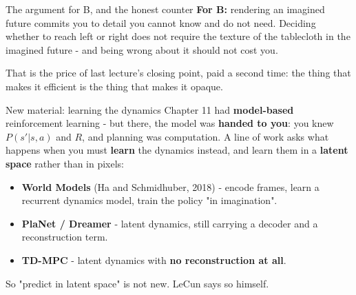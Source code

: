 \documentclass[aspectratio=169]{beamer}
\begin{document}
\begin{frame}{The argument for B, and the honest counter}
  \small
  \textbf{For B:} rendering an imagined future commits you to detail you cannot know and
  do not need. Deciding whether to reach left or right does not require the texture of the
  tablecloth in the imagined future - and being wrong about it should not cost you.
  \vskip 10pt
  \begin{center}
  \end{center}
  \vskip 8pt
  \footnotesize
  That is the price of last lecture's closing point, paid a second time: the thing that
  makes it efficient is the thing that makes it opaque.
\end{frame}

\begin{frame}{New material: learning the dynamics}
  \small
  Chapter 11 had \textbf{model-based} reinforcement learning - but there, the model was
  \textbf{handed to you}: you knew $P(s'|s,a)$ and $R$, and planning was computation.
  \vskip 8pt
  A line of work asks what happens when you must \textbf{learn} the dynamics instead, and
  learn them in a \textbf{latent space} rather than in pixels:
  \vskip 6pt
  \begin{itemize}\small
    \item \textbf{World Models} (Ha and Schmidhuber, 2018) - encode frames, learn a
      recurrent dynamics model, train the policy "in imagination".
    \item \textbf{PlaNet / Dreamer} - latent dynamics, still carrying a decoder and a
      reconstruction term.
    \item \textbf{TD-MPC} - latent dynamics with \textbf{no reconstruction at all}.
  \end{itemize}
  \vskip 8pt
  \begin{center}
    \small\color{armred}So "predict in latent space" is not new. LeCun says so himself.
  \end{center}
\end{frame}
\end{document}
